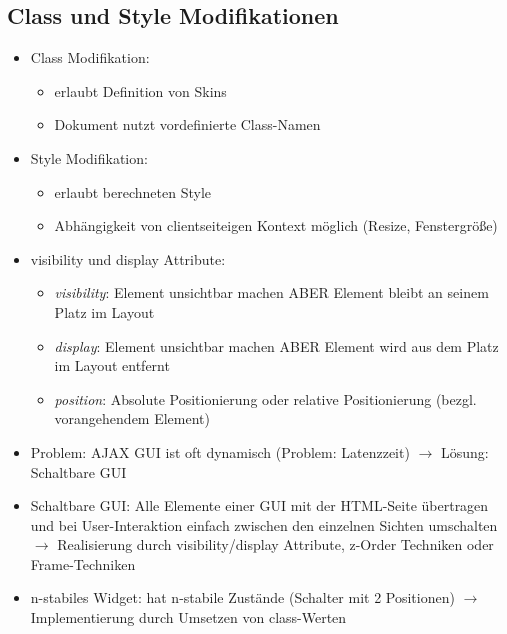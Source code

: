 \documentclass{article} %
\begin{document}
	\subsection{Class und Style Modifikationen}
	\begin{itemize}
		\item Class Modifikation:
		\begin{itemize}
			\item erlaubt Definition von Skins
			\item Dokument nutzt vordefinierte Class-Namen
		\end{itemize}
		\item Style Modifikation:
		\begin{itemize}
			\item erlaubt berechneten Style
			\item Abhängigkeit von clientseiteigen Kontext möglich (Resize, Fenstergröße)
		\end{itemize}
		\item visibility und display Attribute:
		\begin{itemize}
			\item \textit{visibility}: Element unsichtbar machen ABER Element bleibt an seinem Platz im Layout
			\item \textit{display}: Element unsichtbar machen ABER Element wird aus dem Platz im Layout entfernt
			\item \textit{position}: Absolute Positionierung oder relative Positionierung (bezgl. vorangehendem Element)
		\end{itemize}
		\item Problem: AJAX GUI ist oft dynamisch (Problem: Latenzzeit) $\rightarrow$ Lösung: Schaltbare GUI
		\item Schaltbare GUI: Alle Elemente einer GUI mit der HTML-Seite übertragen und bei User-Interaktion einfach zwischen den einzelnen Sichten umschalten $\rightarrow$ Realisierung durch visibility/display Attribute, z-Order Techniken oder Frame-Techniken
		\item n-stabiles Widget: hat n-stabile Zustände (Schalter mit 2 Positionen) $\rightarrow$ Implementierung durch Umsetzen von class-Werten
	\end{itemize}
\end{document}
